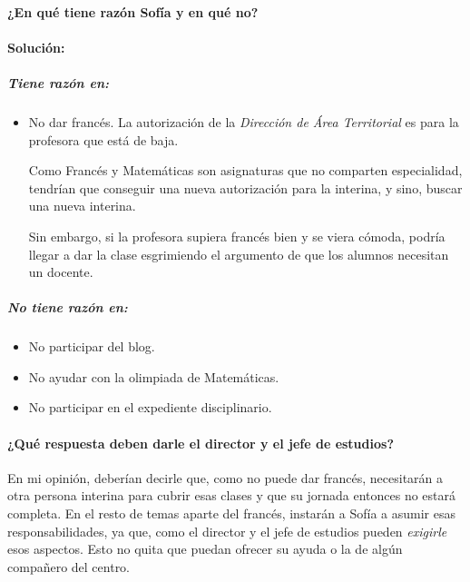 \paragraph{¿En qué tiene razón Sofía y en qué no?}

\paragraph{Solución: }

\subparagraph{Tiene razón en:}

\begin{itemize}
	\item No dar francés.
 La autorización de la \textit{Dirección de Área Territorial} es para la profesora que está de baja.
 
	Como Francés y Matemáticas son asignaturas que no comparten especialidad, tendrían que conseguir una nueva autorización para la interina, y sino, buscar una nueva interina.


	Sin embargo, si la profesora supiera francés bien y se viera cómoda, podría llegar a dar la clase esgrimiendo el argumento de que los alumnos necesitan un docente.

\end{itemize}


\subparagraph{No tiene razón en:}

\begin{itemize}
	\item No participar del blog.

	\item No ayudar con la olimpiada de Matemáticas.

	\item No participar en el expediente disciplinario.

\end{itemize}


\paragraph{¿Qué respuesta deben darle el director y el jefe de estudios?}

En mi opinión, deberían decirle que, como no puede dar francés, necesitarán a otra persona interina para cubrir esas clases y que su jornada entonces no estará completa. 
%
En el resto de temas aparte del francés, instarán a Sofía a asumir esas responsabilidades, ya que, como el director y el jefe de estudios pueden \textit{exigirle} esos aspectos. 
%
Esto no quita que puedan ofrecer su ayuda o la de algún compañero del centro.

